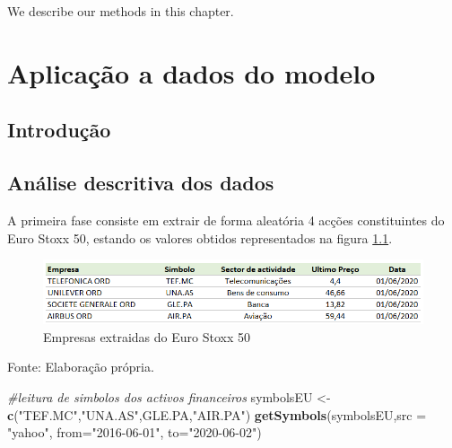 \documentclass[
  12pt,
  a4paper,
  openany]{book}
\newenvironment{Shaded}{\begin{snugshade}}{\end{snugshade}}
\newcommand{\CommentTok}[1]{\textcolor[rgb]{0.56,0.35,0.01}{\textit{#1}}}
\newcommand{\DataTypeTok}[1]{\textcolor[rgb]{0.13,0.29,0.53}{#1}}
\newcommand{\KeywordTok}[1]{\textcolor[rgb]{0.13,0.29,0.53}{\textbf{#1}}}
\newcommand{\NormalTok}[1]{#1}
\newcommand{\StringTok}[1]{\textcolor[rgb]{0.31,0.60,0.02}{#1}}
\begin{document}
\newpage

We describe our methods in this chapter.

\hypertarget{aplicauxe7uxe3o-a-dados-do-modelo}{%
\chapter{Aplicação a dados do modelo}\label{aplicauxe7uxe3o-a-dados-do-modelo}}

\endgroup
\newpage

\hypertarget{introduuxe7uxe3o}{%
\section{Introdução}\label{introduuxe7uxe3o}}

\hypertarget{anuxe1lise-descritiva-dos-dados}{%
\section{Análise descritiva dos dados}\label{anuxe1lise-descritiva-dos-dados}}

A primeira fase consiste em extrair de forma aleatória 4 acções constituintes do Euro Stoxx 50, estando os valores obtidos representados na figura \ref{fig:empresas}.

\begin{figure}

{\centering \includegraphics[width=1\linewidth]{image/cotacao} 

}

\caption{Empresas extraidas do Euro Stoxx 50}\label{fig:empresas}
\end{figure}
\FloatBarrier
\centering

Fonte: Elaboração própria.

\justifying
\bigskip
\scriptsize

\begin{Shaded}
\begin{Highlighting}[]
\CommentTok{\#leitura de simbolos dos activos financeiros}
\NormalTok{symbolsEU \textless{}{-}}\StringTok{ }\KeywordTok{c}\NormalTok{(}\StringTok{"TEF.MC"}\NormalTok{,}\StringTok{"UNA.AS"}\NormalTok{,}\StringTok{\textquotesingle{}GLE.PA\textquotesingle{}}\NormalTok{,}\StringTok{"AIR.PA"}\NormalTok{)}
\KeywordTok{getSymbols}\NormalTok{(symbolsEU,}\DataTypeTok{src =} \StringTok{"yahoo"}\NormalTok{, }\DataTypeTok{from=}\StringTok{"2016{-}06{-}01"}\NormalTok{, }\DataTypeTok{to=}\StringTok{"2020{-}06{-}02"}\NormalTok{)}
\end{Highlighting}
\end{Shaded}
\end{document}
